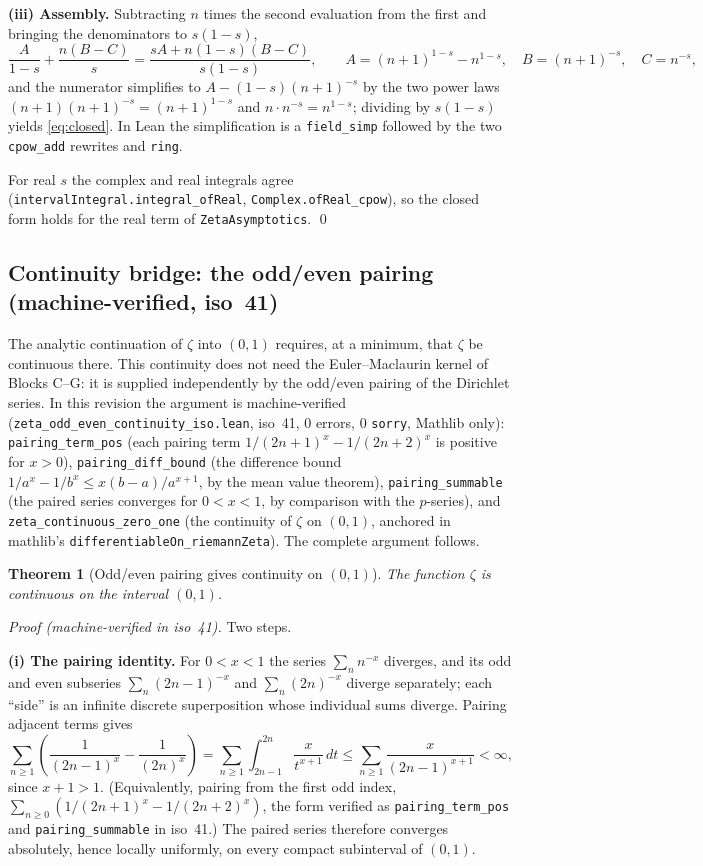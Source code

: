 \documentclass{article}
\newtheorem{theorem}{Theorem}[section]
\newcommand{\zt}{\zeta}
\begin{document}
\textbf{(iii) Assembly.} Subtracting $n$ times the second evaluation from
the first and bringing the denominators to $s(1-s)$,
\[
\frac{A}{1-s}+\frac{n(B-C)}{s}=\frac{sA+n(1-s)(B-C)}{s(1-s)},
\qquad
A=(n+1)^{1-s}-n^{1-s},\quad B=(n+1)^{-s},\quad C=n^{-s},
\]
and the numerator simplifies to $A-(1-s)(n+1)^{-s}$ by the two power laws
$(n+1)(n+1)^{-s}=(n+1)^{1-s}$ and $n\cdot n^{-s}=n^{1-s}$; dividing by
$s(1-s)$ yields \eqref{eq:closed}. In Lean the simplification is a
\texttt{field\_simp} followed by the two \texttt{cpow\_add} rewrites and
\texttt{ring}.

For real $s$ the complex and real integrals agree
(\texttt{intervalIntegral.integral\_ofReal},
\texttt{Complex.ofReal\_cpow}), so the closed form holds for the real term
of \texttt{ZetaAsymptotics}.
\qed

\subsection{Continuity bridge: the odd/even pairing (machine-verified, iso~41)}
\label{sec:contbridge}

The analytic continuation of $\zt$ into $(0,1)$ requires, at a minimum, that
$\zt$ be continuous there. This continuity does not need the
Euler--Maclaurin kernel of Blocks C--G: it is supplied independently by the
odd/even pairing of the Dirichlet series. In this revision the argument is
machine-verified (\texttt{zeta\_odd\_even\_continuity\_iso.lean}, iso~41,
0 errors, 0 \texttt{sorry}, Mathlib only): \texttt{pairing\_term\_pos}
(each pairing term $1/(2n+1)^x-1/(2n+2)^x$ is positive for $x>0$),
\texttt{pairing\_diff\_bound} (the difference bound
$1/a^x-1/b^x\le x(b-a)/a^{x+1}$, by the mean value theorem),
\texttt{pairing\_summable} (the paired series converges for $0<x<1$, by
comparison with the $p$-series), and \texttt{zeta\_continuous\_zero\_one}
(the continuity of $\zt$ on $(0,1)$, anchored in mathlib's
\texttt{differentiableOn\_riemannZeta}). The complete argument follows.

\begin{theorem}[Odd/even pairing gives continuity on $(0,1)$]
\label{thm:contbridge}
The function $\zt$ is continuous on the interval $(0,1)$.
\end{theorem}

\emph{Proof (machine-verified in iso~41).}
Two steps.

\textbf{(i) The pairing identity.} For $0<x<1$ the series $\sum_n n^{-x}$
diverges, and its odd and even subseries $\sum_n(2n-1)^{-x}$ and
$\sum_n(2n)^{-x}$ diverge separately; each ``side'' is an infinite discrete
superposition whose individual sums diverge. Pairing adjacent terms gives
\[
\sum_{n\ge1}\left(\frac1{(2n-1)^x}-\frac1{(2n)^x}\right)
=\sum_{n\ge1}\int_{2n-1}^{2n}\frac{x}{t^{x+1}}\,dt
\le\sum_{n\ge1}\frac{x}{(2n-1)^{x+1}}<\infty,
\]
since $x+1>1$. (Equivalently, pairing from the first odd index,
$\sum_{n\ge 0}(1/(2n+1)^x-1/(2n+2)^x)$, the form verified as
\texttt{pairing\_term\_pos} and \texttt{pairing\_summable} in iso~41.)
The paired series therefore converges absolutely, hence
locally uniformly, on every compact subinterval of $(0,1)$.
\end{document}
